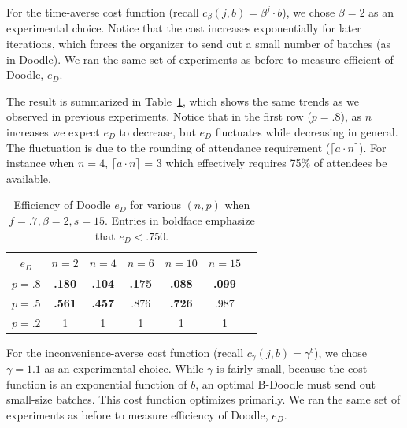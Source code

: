 For the time-averse cost function (recall $c_{\beta}(j, b) = \beta^j \cdot b$), we chose $\beta = 2$ as an experimental choice. Notice that the cost increases exponentially for later iterations, which forces the organizer to send out a small number of batches (as in Doodle). We ran the same set of experiments as before to measure efficient of Doodle, $e_{D}$. 

The result is summarized in Table~\ref{bdoodle:table:DoodleEfficiency-lower-attendance_time_averse}, which shows the same trends as we observed in previous experiments. Notice that in the first row ($p = .8$), as $n$ increases we expect $e_{D}$ to decrease, but $e_{D}$ fluctuates while decreasing in general. The fluctuation is due to the rounding of attendance requirement ($\lceil a \cdot n \rceil$). For instance when $n = 4$, $\lceil a \cdot n \rceil$ = 3 which effectively requires 75\% of attendees be available. 
\begin{table}[h]  %
\centering
\begin{tabular}{|c|c|c|c|c|c|c|}
	\hline
	$e_{D}$ & $n = 2$ & $n = 4$ & $n = 6$ & $ n = 10 $ & $n = 15$ \\ \hline
	$p = .8$ & \textbf{.180} & \textbf{.104} & \textbf{.175} & \textbf{.088} & \textbf{.099} \\ \hline
	$p = .5$ & \textbf{.561} & \textbf{.457} & .876 & \textbf{.726} & .987  \\ \hline
	$p = .2$ & 1 & 1 & 1 & 1 & 1\\ \hline	
\end{tabular}
\caption{Efficiency of Doodle $e_{D}$ for various $(n, p)$ when $f = .7, \beta=2, s = 15$.
Entries in boldface emphasize that $e_{D} < .750$.
} \label{bdoodle:table:DoodleEfficiency-lower-attendance_time_averse}
\end{table}

For the inconvenience-averse cost function (recall $c_{\gamma}(j, b) = \gamma^{b}$), we chose $\gamma = 1.1$ as an experimental choice. While $\gamma$ is fairly small, because the cost function is an exponential function of $b$, an optimal B-Doodle must send out small-size batches. This cost function optimizes \Inconveniences primarily. We ran the same set of experiments as before to measure efficiency of Doodle, $e_{D}$. 

